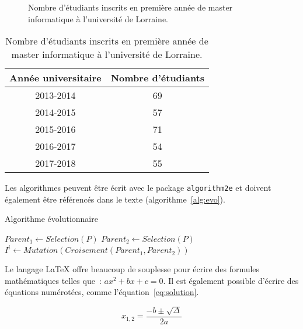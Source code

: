 \documentclass{ir}
\begin{document}
\begin{figure}
\centering{}
\caption{Nombre d'étudiants inscrits en première année de master informatique à l'université de Lorraine.}
\label{fig:nombre}
\end{figure}

\begin{table}
\centering\begin{tabular}{cc}
          Année universitaire & Nombre d'étudiants\\
          \hline
          2013-2014 & 69 \\
          2014-2015 & 57 \\
          2015-2016 & 71 \\
          2016-2017 & 54 \\
          2017-2018 & 55 \\
          \hline
          \end{tabular}
\caption{Nombre d'étudiants inscrits en première année de master informatique à l'université de Lorraine.}
\label{tab:nombre}
\end{table}

Les algorithmes peuvent être écrit avec le package \texttt{algorithm2e} et doivent également être référencés dans le texte (algorithme~\ref{alg:evo}).

\begin{algorithme}[!htt]
\caption{Algorithme évolutionnaire}
\label{alg:evo}
\begin{algorithm}[H]
{
   {
      $Parent_1\leftarrow S\acute{e}lection\left(P\right)$\;
      $Parent_2\leftarrow S\acute{e}lection\left(P\right)$\;
      $I^i\leftarrow Mutation\left(Croisement\left(Parent_1,Parent_2\right)\right)$\;
   }
}
\end{algorithm}
\end{algorithme}

Le langage \LaTeX{} offre beaucoup de souplesse pour écrire des formules mathématiques telles que~: $ax^2+bx+c=0$. Il est également possible d'écrire des équations numérotées, comme l'équation~\ref{eq:solution}.

\begin{equation}
x_{1,2} = \frac{- b \pm \sqrt{\Delta}}{2a}\label{eq:solution}
\end{equation}
\end{document}
